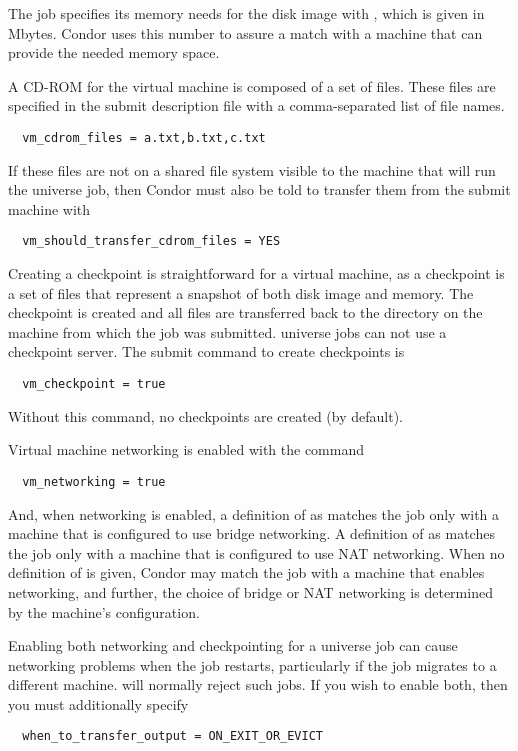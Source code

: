 The job specifies its memory needs 
for the disk image with ,
which is given in Mbytes.
Condor uses this number to assure a match with a machine
that can provide the needed memory space.

A CD-ROM for the virtual machine is composed of a set of files.
These files are specified in the submit description file
with a comma-separated list of file names.
\begin{verbatim}
  vm_cdrom_files = a.txt,b.txt,c.txt
\end{verbatim}
If these files are not on a shared file system visible to
the machine that will run the  universe job, then
Condor must also be told to transfer them from
the submit machine with 
\begin{verbatim}
  vm_should_transfer_cdrom_files = YES
\end{verbatim}

Creating a checkpoint is straightforward for a virtual machine,
as a checkpoint is a set of files that represent
a snapshot of both disk image and memory.
The checkpoint is created and all files are transferred back
to the  directory on the machine from which
the job was submitted.
 universe jobs can not use a checkpoint server.
The submit command to create checkpoints is
\begin{verbatim}
  vm_checkpoint = true
\end{verbatim}
Without this command, no checkpoints are created (by default).

Virtual machine networking is enabled with the command
\begin{verbatim}
  vm_networking = true
\end{verbatim}
And, when networking is enabled, a definition of
 as 
matches the job only with a machine that is configured to use
bridge networking.
A definition of
 as 
matches the job only with a machine that is configured to use
NAT networking.
When no definition of
 is given,
Condor may
match the job with a machine that enables networking,
and further, the choice of bridge or NAT networking
is determined by the machine's configuration.

Enabling both networking and checkpointing for a 
universe job can cause networking problems when the job restarts,
particularly if the job migrates to a different machine.
 will normally reject such jobs.
If you wish to enable both, then you must additionally specify
\begin{verbatim}
  when_to_transfer_output = ON_EXIT_OR_EVICT
\end{verbatim}


